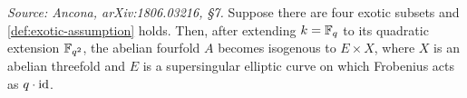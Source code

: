 \begin{lemma}
  \label{lem:exotic-supersingular}
  \textit{Source: Ancona, arXiv:1806.03216, §7.}
  Suppose there are four exotic subsets and \cref{def:exotic-assumption} holds.
  Then, after extending \(k = \mathbb{F}_q\) to its quadratic extension \(\mathbb{F}_{q^2}\), the
  abelian fourfold \(A\) becomes isogenous to \(E \times X\), where \(X\) is an
  abelian threefold and \(E\) is a supersingular elliptic curve on which
  Frobenius acts as \(q \cdot \mathrm{id}\).
\end{lemma}


